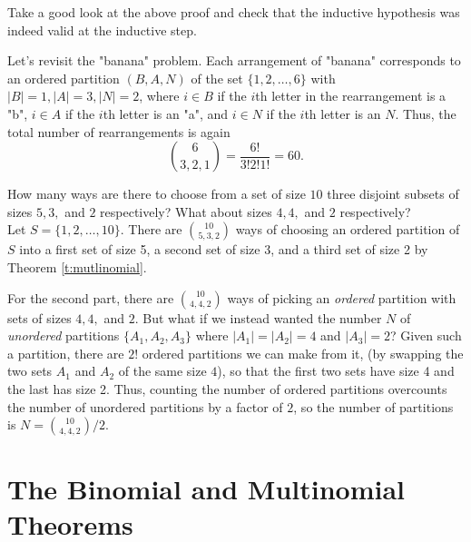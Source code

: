 \documentclass[11pt,dvipsnames]{book}
\numberwithin{equation}{section} %
\numberwithin{figure}{section} %
\numberwithin{table}{section} %
\begin{document}
Take a good look at the above proof and check that the inductive hypothesis was indeed valid at the inductive step. 

\begin{example}
Let's revisit the "banana" problem. Each arrangement of "banana" corresponds to an ordered partition $(B,A,N)$ of the set $\{1,2, \dots ,6\}$ with $|B|=1,|A|=3,|N|=2$, where $i\in B$ if the $i$th letter in the rearrangement is a "b", $i\in A$ if the $i$th letter is an "a", and $i\in N$ if the $i$th letter is an $N$. Thus, the total number of rearrangements is again
\[
{6 \choose 3 , 2, 1} = \frac{6!}{3!2!1!}=60.
\]
\end{example}


\begin{example}
How many ways are there to choose from a set of size $10$ three disjoint subsets of sizes $5,3,$ and $2$ respectively? What about sizes $4,4,$ and $2$ respectively? \\


Let $S=\{1,2,\dots,10\}$. There are ${10\choose 5,3,2}$ ways of choosing an ordered partition of $S$ into a first set of size 5, a second set of size 3, and a third set of size 2 by Theorem \ref{t:mutlinomial}.



For the second part, there are ${10\choose 4,4,2}$ ways of picking an {\it ordered} partition with sets of sizes $4,4,$ and $2$. But what if we instead wanted the number $N$ of {\it unordered} partitions $\{A_{1},A_{2},A_{3}\}$ where $|A_{1}|=|A_{2}|=4$ and $|A_{3}|=2$? Given such a partition, there are $2!$ ordered partitions we can make from it, (by swapping the two sets $A_1$ and $A_2$ of the same size $4$), so that the first two sets have size 4 and the last has size 2. 
Thus, counting the number of ordered partitions overcounts the number of unordered partitions by a factor of $2$, so the number of partitions is $N= {10\choose 4,4,2}/2$. 

\end{example}



\section{The Binomial and Multinomial Theorems}
\end{document}
